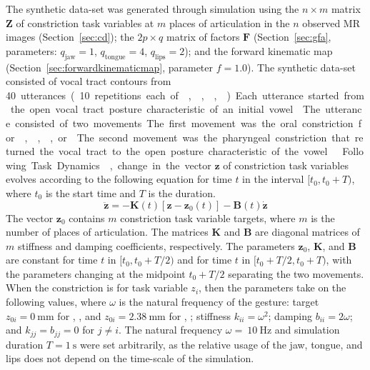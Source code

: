 \documentclass[preprint]{JASAnew}\usepackage[]{graphicx}\usepackage[]{color}
\begin{document}
The synthetic data-set was generated through simulation using the $n\times m$ matrix $\mathbf{Z}$ of constriction task variables at $m$ places of articulation in the $n$ observed MR images (Section~\ref{sec:cd}); the $2p\times q$ matrix of factors $\mathbf{F}$ (Section~\ref{sec:gfa}, parameters: $q_\text{jaw}=1$, $q_\text{tongue}=4$, $q_\text{lips}=2$); and the forward kinematic map (Section~\ref{sec:forwardkinematicmap}, parameter $f=1.0$). 
The synthetic data-set consisted of vocal tract contours from \SI{40} utterances (\SI{10}~repetitions each of \textipa{[ApA]}, \textipa{[AtA]}, \textipa{[AiA]}, \textipa{[AkA]}). 
Each utterance started from the open vocal tract posture characteristic of an initial vowel \textipa{[A]}. 
The utterance consisted of two movements.
The first movement was the oral constriction for \textipa{[p]}, \textipa{[t]}, \textipa{[k]}, or \textipa{[i]}. 
The second movement was the pharyngeal constriction that returned the vocal tract to the open posture characteristic of the vowel \textipa{[A]}~\citep{wood1979radiographic}.

Following Task Dynamics~\citep{saltzman1989dynamical}, change in the vector $\mathbf{z}$ of constriction task variables evolves according to the following equation for time $t$ in the interval $[t_0, t_0+T)$, where $t_0$ is the start time and $T$ is the duration.
\begin{equation}
\label{eq:td_basic}
\mathbf{\ddot{z}} = -\mathbf{K}(t)\left[\mathbf{z} - \mathbf{z}_0(t)\right] -\mathbf{B}(t)\mathbf{\dot{z}}
\end{equation}
The vector $\mathbf{z}_0$ contains $m$ constriction task variable targets, where $m$ is the number of places of articulation. The matrices $\mathbf{K}$ and $\mathbf{B}$ are diagonal matrices of $m$ stiffness and damping coefficients, respectively.
The parameters $\mathbf{z}_0$, $\mathbf{K}$, and $\mathbf{B}$ are constant for time $t$ in $[t_0, t_0+T/2)$ and for time $t$ in $[t_0+T/2, t_0+T)$, with the parameters changing at the midpoint $t_0+T/2$ separating the two movements.
When the constriction is for task variable $z_i$, then the parameters take on the following values, where $\omega$ is the natural frequency of the gesture: target $z_{0i} = \SI{0}{\milli\meter}$ for \textipa{[p]}, \textipa{[t]}, \textipa{[k]} and $z_{0i} = \SI{2.38}{\milli\meter}$ for \textipa{[i]}, \textipa{[A]}; stiffness $k_{ii} = \omega^2$; damping $b_{ii} = 2\omega$; and $k_{jj} = b_{jj} = 0$ for $j \neq i$.
The natural frequency $\omega = ~\SI{10}{\Hz}$ and simulation duration $T= \SI{1}{\second}$ were set arbitrarily, as the relative usage of the jaw, tongue, and lips does not depend on the time-scale of the simulation.
\end{document}
